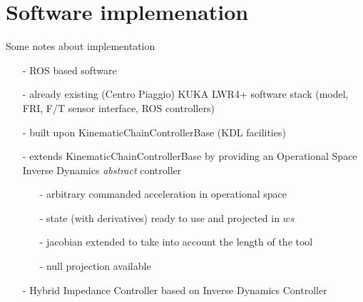 \section{Software implemenation}
\begin{frame}{Some notes about implementation}
  \begin{itemize}
  \item[-] ROS based software
  \item[-] already existing (Centro Piaggio) KUKA LWR4+ software stack (model, FRI, F/T sensor interface, ROS controllers)
  \item[-] built upon KinematicChainControllerBase (KDL facilities)
  \item[-] extends KinematicChainControllerBase by providing an Operational Space Inverse Dynamics \emph{abstract} controller
    \begin{itemize}
    \item[-] arbitrary commanded acceleration in operational space
    \item[-] state (with derivatives) ready to use and projected in $ws$
    \item[-] jacobian extended to take into account the length of the tool
    \item[-] null projection available
    \end{itemize}
  \item[-] Hybrid Impedance Controller based on Inverse Dynamics Controller
  \end{itemize}
\end{frame}
